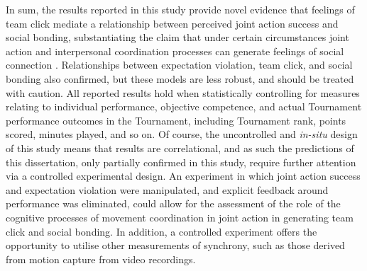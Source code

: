   In sum, the results reported in this study provide novel evidence that feelings of team click mediate a relationship between perceived joint action success and social bonding, substantiating the claim that under certain circumstances joint action and interpersonal coordination processes can generate feelings of social connection \citep{Marsh2009}. Relationships between expectation violation, team click, and social bonding
  also confirmed, but these models are less robust, and should be treated with caution. All reported results hold when statistically controlling for measures relating to individual performance, objective competence, and actual Tournament performance outcomes in the Tournament, including Tournament rank, points scored, minutes played, and so on.  Of course, the uncontrolled and \textit{in-situ} design of this study means that results are correlational, and as such the predictions of this dissertation, only partially confirmed in this study, require further attention via a controlled experimental design.  An experiment in which joint action success and expectation violation were manipulated, and explicit feedback around performance was eliminated, could allow for the assessment of the role of the cognitive processes of movement coordination in joint action in generating team click and social bonding.  In addition, a controlled experiment offers the opportunity to utilise other measurements of synchrony, such as those derived from motion capture from video recordings.





